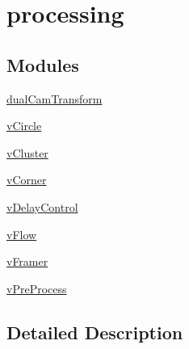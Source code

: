 \hypertarget{group__processing}{}\section{processing}
\label{group__processing}
\subsection*{Modules}
\begin{DoxyCompactItemize}
\item 
\hyperlink{group__dualCamTransform}{dual\+Cam\+Transform}
\item 
\hyperlink{group__vCircle}{v\+Circle}
\item 
\hyperlink{group__vCluster}{v\+Cluster}
\item 
\hyperlink{group__vCorner}{v\+Corner}
\item 
\hyperlink{group__vDelayControl}{v\+Delay\+Control}
\item 
\hyperlink{group__vFlow}{v\+Flow}
\item 
\hyperlink{group__vFramer}{v\+Framer}
\item 
\hyperlink{group__vPreProcess}{v\+Pre\+Process}
\end{DoxyCompactItemize}


\subsection{Detailed Description}
